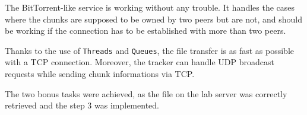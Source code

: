 The BitTorrent-like service is working without any trouble. It handles the cases where the chunks are supposed to be owned by two peers but are not, and should be working if the connection has to be established with more than two peers.

Thanks to the use of \texttt{Threads} and \texttt{Queues}, the file transfer is as fast as possible with a TCP connection. Moreover, the tracker can handle UDP broadcast requests while sending chunk informations via TCP.

The two bonus tasks were achieved, as the file on the lab server was correctly retrieved and the step 3 was implemented.